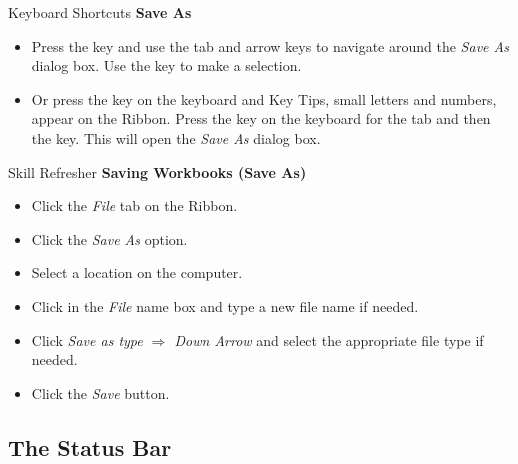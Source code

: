 \begin{center}
	\begin{shtcutbox}{Keyboard Shortcuts}
		\textbf{Save As}
		\\
		\begin{itemize}
			\setlength{\itemsep}{0pt}
			\setlength{\parskip}{0pt}
			\setlength{\parsep}{0pt}
			
			\item Press the  key and use the tab and arrow keys to navigate around the \textit{Save As} dialog box. Use the  key to make a selection.
			\item Or press the  key on the keyboard and Key Tips, small letters and numbers, appear on the Ribbon. Press the  key on the keyboard for the  tab and then the  key. This will open the \textit{Save As} dialog box.
			
		\end{itemize}
	\end{shtcutbox}
\end{center}

\begin{center}
	\begin{sklbox}{Skill Refresher}
		\textbf{Saving Workbooks (Save As)}
		\\
		\begin{itemize}
			\setlength{\itemsep}{0pt}
			\setlength{\parskip}{0pt}
			\setlength{\parsep}{0pt}
			
			\item Click the \textit{File} tab on the Ribbon.
			\item Click the \textit{Save As} option.
			\item Select a location on the computer.
			\item Click in the \textit{File} name box and type a new file name if needed.
			\item Click \textit{Save as type $ \Rightarrow $ Down Arrow} and select the appropriate file type if needed.
			\item Click the \textit{Save} button.
		
		\end{itemize}
	\end{sklbox}
\end{center}

\subsection{The Status Bar}

